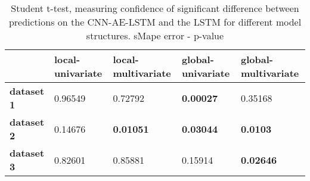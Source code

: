 \begin{table}[h]
\centering
\caption{Student t-test, measuring confidence of significant difference between predictions on the CNN-AE-LSTM and the LSTM for different model structures. sMape error - p-value}
\label{table:ttest-p-values-main-experiments-sMAPE}
\begin{tabular}{lllll}
\toprule
{} & local-univariate & local-multivariate & global-univariate & global-multivariate \\
\midrule
\textbf{dataset 1} &          0.96549 &            0.72792 &  \textbf{0.00027} &             0.35168 \\
\textbf{dataset 2} &          0.14676 &   \textbf{0.01051} &  \textbf{0.03044} &     \textbf{0.0103} \\
\textbf{dataset 3} &          0.82601 &            0.85881 &           0.15914 &    \textbf{0.02646} \\
\bottomrule
\end{tabular}
\end{table}
